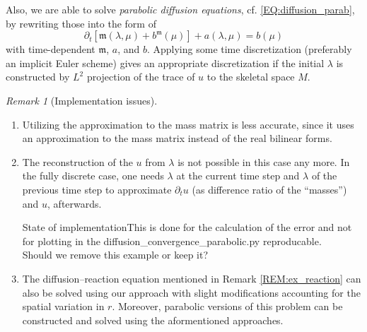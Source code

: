 \documentclass[a4paper, english, 12pt, reqno, draft]{amsart}
\theoremstyle{definition}
\theoremstyle{remark}
\newtheorem{remark}[theorem]{Remark}
\numberwithin{equation}{section}
\newcommand{\skeletalSpace}{\ensuremath{M}}
\newcommand{\mass}{\ensuremath{\mathfrak m}}
\begin{document}
Also, we are able to solve \emph{parabolic diffusion equations}, cf. \eqref{EQ:diffusion_parab}, by rewriting those into the form of
% 
\begin{equation}
 \partial_t \left[ \mass(\lambda, \mu) + b^\mass(\mu) \right] + a(\lambda, \mu) = b(\mu)
\end{equation}
% 
with time-dependent $\mass$, $a$, and $b$. Applying some time discretization (preferably an implicit Euler scheme) gives an appropriate discretization if the initial $\lambda$ is constructed by $L^2$ projection of the trace of $u$ to the skeletal space $\skeletalSpace$.
% 
\begin{remark}[Implementation issues]\
 \begin{enumerate}
  \item Utilizing the approximation to the mass matrix is less accurate, since it uses an approximation to the mass matrix instead of the real bilinear forms.
  \item The reconstruction of the $u$ from $\lambda$ is not possible in this case any more. In the fully discrete case, one needs $\lambda$ at the current time step and $\lambda$ of the previous time step to approximate $\partial_t u$ (as difference ratio of the ``masses'') and $u$, afterwards.
  \begin{envarwarning}{State of implementation}This is done for the calculation of the error and not for plotting in the diffusion\_convergence\_parabolic.py reproducable.\\ Should we remove this example or keep it?\end{envarwarning}
  \item The diffusion--reaction equation mentioned in Remark \ref{REM:ex_reaction} can also be solved using our approach with slight modifications accounting for the spatial variation in $r$. Moreover, parabolic versions of this problem can be constructed and solved using the aformentioned approaches.
 \end{enumerate}
\end{remark}
% 
\end{document}
